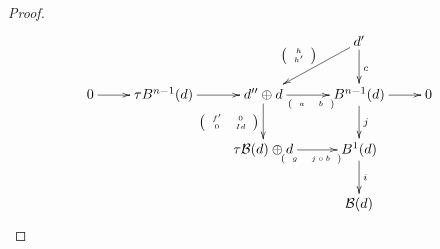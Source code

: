 \documentclass{amsart}
\theoremstyle{plain}
\theoremstyle{definition}
\begin{document}
\begin{proof}
$$\xymatrix@R=.8cm@C=.8cm{ &&& d' \ar[d]^c \ar[dl]_{\tiny{\left(
                 \begin{array}{c}
                   h \\
                   h' \\
                 \end{array}
               \right)}}&\\
0 \ar[r] & \tau B^{n-1}(d)\ar[r] & d''\oplus d \ar[d]_{\tiny{\left(
                                                                      \begin{array}{cc}
                                                                        f' & 0 \\
                                                                        0 & Id \\
                                                                      \end{array}
                                                                    \right)}
} \ar[r]_{\tiny{\left(
                                                  \begin{array}{cc}
                                                    a & b \\
                                                  \end{array}
                                                \right)
}} & B^{n-1}(d) \ar[d]^j \ar[r] & 0 \\
&& \tau \mathcal{B}(d)\oplus d \ar[r] _{\tiny{\left(
                                                  \begin{array}{cc}
                                                    g & j\circ b \\
                                                  \end{array}
                                                \right)
}}& B^1(d) \ar[d]^i& \\
&&& \mathcal{B}(d) &
}$$


\end{proof}
\end{document}
